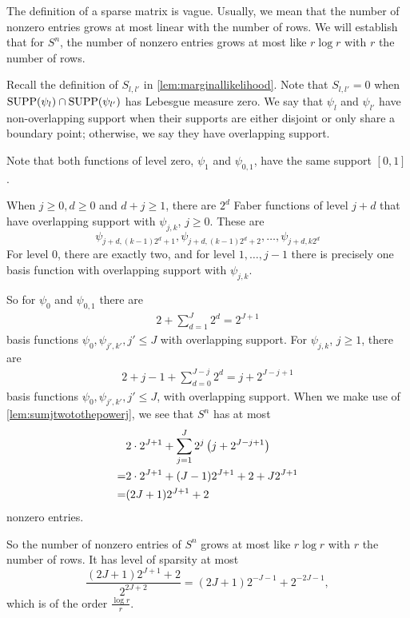 \documentclass[12pt]{article}
\begin{document}
The definition of a sparse matrix is vague. Usually, we mean that the number of nonzero entries grows at most linear with the number of rows. We will establish that for $S^n$, the number of nonzero entries grows at most like $r\log r$ with $r$ the number of rows. 

Recall the definition of $S_{l,l'}$ in \cref{lem:marginallikelihood}.
Note that $S_{l,l'}=0$  when $\operatorname{SUPP}(\psi_l)\cap\operatorname{SUPP}(\psi_{l'})$ has Lebesgue measure zero. We say that $\psi_l$ and $\psi_{l'}$ have non-overlapping support when their supports are either disjoint or only share a boundary point; otherwise, we say they have overlapping support. 


Note that both functions of level zero,  \(\psi_1\) and \(\psi_{0,1}\), have the same support $[0,1]$. 

When $j\ge 0, d\ge 0$ and $d+j\ge 1$, there are \(2^d\) Faber functions of level \(j+d\) that have overlapping support with \(\psi_{j,k}\), \(j\ge 0\). These are 
\[
\psi_{j+d,(k-1)2^d+1},\psi_{j+d,(k-1)2^d+2},\ldots,\psi_{j+d,k2^d}
\]
For level 0, there are exactly two, and for level $1,\ldots,j-1$ there is precisely one basis function with overlapping support with $\psi_{j,k}$. 

So for $\psi_0$ and $\psi_{0,1}$ there are \begin{align*}
    2 + \sum_{d=1}^J 2^d = 2^{J+1} 
\end{align*}
basis functions $\psi_0,\psi_{j',k'}, j'\le J$ with overlapping support. 
For $\psi_{j,k}$, $j\ge 1$,  there are \begin{align*}
    2+ j-1 + \sum_{d=0}^{J-j} 2^d = %
    j+2^{J-j+1}
\end{align*}
basis functions $\psi_0,\psi_{j',k'}, j'\le J$, with overlapping support. When we make use of \cref{lem:sumjtwotothepowerj}, we see that $S^n$ has at most \begin{align*}
   &2\cdot 2^{J+1}+\sum_{ j=1}^J 2^j\left(j+2^{J-j+1}\right)\\
= & 2\cdot 2^{J+1}+ (J-1)2^{J+1} + 2 + J2^{J+1}  \\
= & (2J+1)2^{J+1}+2
\end{align*}
nonzero entries. 

So the number of nonzero entries of $S^n$ grows at most like $r\log r$ with $r$ the number of rows. It has level of sparsity at most
\[
\frac{(2J+1)2^{J+1}+2
}{2^{2J+2}}= (2J+1)2^{-J-1}+2^{-2J-1},
\]
which is of the order $\frac {\log r}r$. 
\end{document}
